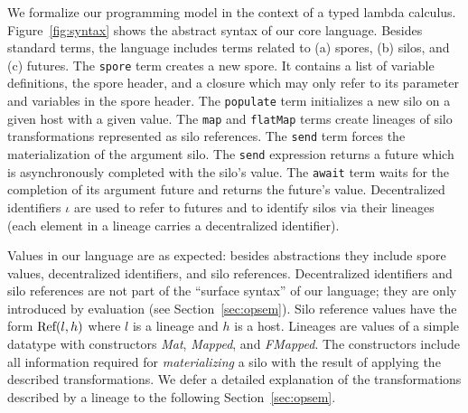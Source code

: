 We formalize our programming model in the context of a typed lambda
calculus. Figure~\ref{fig:syntax} shows the abstract syntax of our
core language. Besides standard terms, the language includes terms
related to (a) spores, (b) silos, and (c) futures. The \verb|spore|
term creates a new spore. It contains a list of variable definitions,
the spore header, and a closure which may only refer to its parameter
and variables in the spore header. The \verb|populate| term
initializes a new silo on a given host with a given value. The \verb|map| and
\verb|flatMap| terms create lineages of silo transformations
represented as silo references.  The \verb|send| term forces the
materialization of the argument silo. The \verb|send| expression
returns a future which is asynchronously completed with the silo's
value. The \verb|await| term waits for the completion of its argument
future and returns the future's value. Decentralized identifiers
$\iota$ are used to refer to futures and to identify silos via their
lineages (each element in a lineage carries a decentralized
identifier).

Values in our language are as expected: besides abstractions they
include spore values, decentralized identifiers, and silo
references. Decentralized identifiers and silo references are not part
of the ``surface syntax'' of our language; they are only introduced by
evaluation (see Section~\ref{sec:opsem}). Silo reference values have
the form ${\textrm{Ref}(l, h)}$ where $l$ is a lineage and $h$ is a
host. Lineages are values of a simple datatype with constructors {\em
  Mat}, {\em Mapped}, and {\em FMapped}. The constructors include all
information required for {\em materializing} a silo with the result of
applying the described transformations. We defer a detailed
explanation of the transformations described by a lineage to the
following Section~\ref{sec:opsem}.

